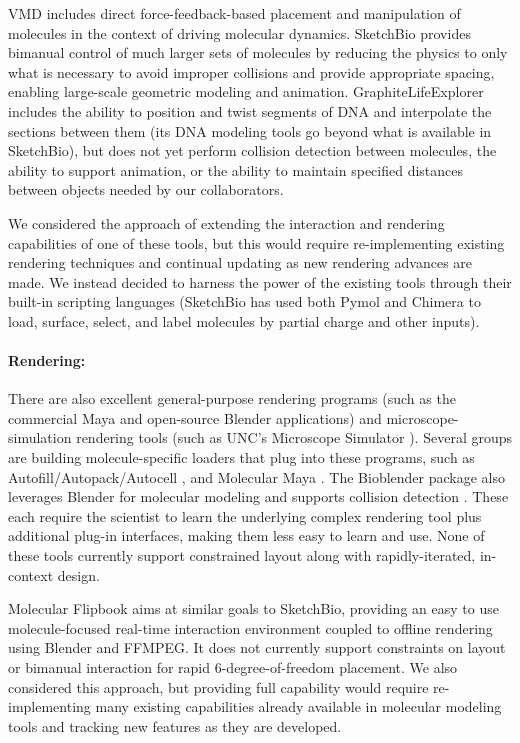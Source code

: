 \documentclass[twocolumn]{bmcart}%
\begin{document}
VMD includes direct force-feedback-based placement and manipulation of molecules in the context of driving molecular dynamics.  SketchBio provides bimanual control of much larger sets of molecules by reducing the physics to only what is necessary to avoid improper collisions and provide appropriate spacing, enabling large-scale geometric modeling and animation.
GraphiteLifeExplorer includes the ability to position and twist segments of DNA and interpolate the sections between them (its DNA modeling tools go beyond what is available in SketchBio), but does not yet perform collision detection between molecules, the ability to support animation, or the ability to maintain specified distances between objects needed by our collaborators.

We considered the approach of extending the interaction and rendering capabilities of one of these tools, but this would require re-implementing existing rendering techniques and continual updating as new rendering advances are made.
We instead decided to harness the power of the existing tools through their built-in scripting languages (SketchBio has used both Pymol and Chimera to load, surface, select, and label molecules by partial charge and other inputs).

\paragraph*{Rendering:}
There are also excellent general-purpose rendering programs (such as the commercial Maya and open-source Blender applications) and microscope-simulation rendering tools (such as UNC's Microscope Simulator \cite{quammen2008}).
Several groups are building molecule-specific loaders that plug into these programs, such as Autofill/Autopack/Autocell \cite{Johnson2013}, and Molecular Maya \cite{molecularmaya}. The Bioblender package also leverages Blender for molecular modeling and supports collision detection \cite{zini2010bioblender}. These each require the scientist to learn the underlying complex rendering tool plus additional plug-in interfaces, making them less easy to learn and use. None of these tools currently support constrained layout along with rapidly-iterated, in-context design.

Molecular Flipbook \cite{flipbook2013} aims at similar goals to SketchBio, providing an easy to use molecule-focused real-time interaction environment coupled to offline rendering using Blender and FFMPEG.  It does not currently support constraints on layout or bimanual interaction for rapid 6-degree-of-freedom placement.
We also considered this approach, but providing full capability would require re-implementing many existing capabilities already available in molecular modeling tools and tracking new features as they are developed.
\end{document}
